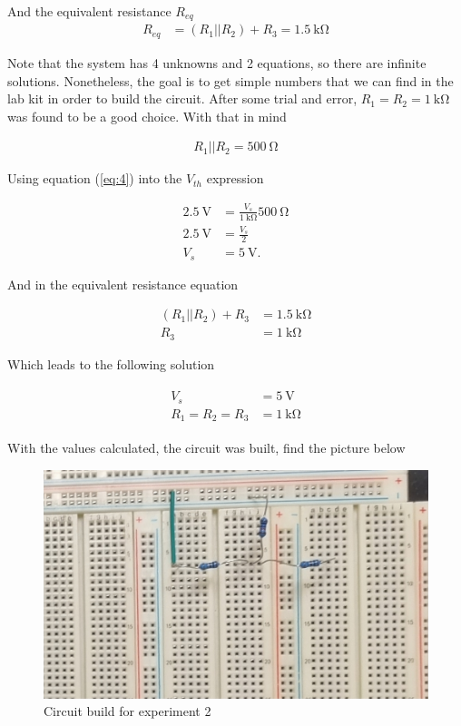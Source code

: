 \documentclass[english,12pt]{article}
\begin{document}
And the equivalent resistance $R_{eq}$
\begin{align*}
    R_{eq} &= (R_1||R_2) + R_3 = \SI{1.5}{\kilo\ohm}
\end{align*}

Note that the system has 4 unknowns and 2 equations, so there are infinite solutions. Nonetheless, the goal is to get simple numbers that we can find in the lab kit in order to build the circuit. After some trial and error, $R_1 = R_2 = \SI{1}{\kilo\ohm}$ was found to be a good choice. With that in mind

\begin{align}
    R_1 ||R_2 = \SI{500}{\ohm} \label{eq:4}
\end{align}

Using equation (\ref{eq:4}) into the $V_{th}$ expression

\begin{align*}
    \SI{2.5}{\volt} &= \frac{V_s}{\SI{1}{\kilo\ohm}} \SI{500}{\ohm}\\
    \SI{2.5}{\volt} &= \frac{V_s}{2}\\
    V_s &= \SI{5}{\volt}.
\end{align*}

And in the equivalent resistance equation

\begin{align*}
    (R_1||R_2) + R_3 &= \SI{1.5}{\kilo\ohm}\\
    R_3 &= \SI{1}{\kilo\ohm}
\end{align*}

Which leads to the following solution

\begin{align*}
\boxed{
\begin{array}{rcl}
V_s &= \SI{5}{\volt} \\
R_1 = R_2 = R_3 &= \SI{1}{\kilo\ohm}
\end{array}
}
\end{align*}

With the values calculated, the circuit was built, find the picture below 

\begin{figure}[h]
    \centering
    \includegraphics[scale=0.35]{20221012_202819.jpg}
    \caption{Circuit build for experiment 2}
    \label{fig:16}
\end{figure}
\end{document}
